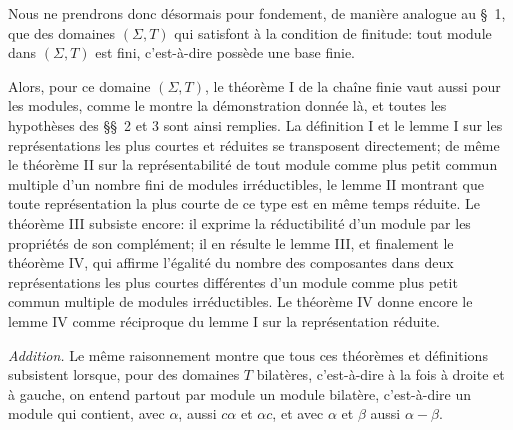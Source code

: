 Nous ne prendrons donc désormais pour fondement, de manière analogue au \S~1, que des domaines $(\Sigma,T)$ qui satisfont à la condition de finitude: tout module dans $(\Sigma,T)$ est fini, c'est-à-dire possède une base finie.

Alors, pour ce domaine $(\Sigma,T)$, le théorème I de la chaîne finie vaut aussi pour les modules, comme le montre la démonstration donnée là, et toutes les hypothèses des \S\S~2 et 3 sont ainsi remplies. La définition I et le lemme I sur les représentations les plus courtes et réduites se transposent directement; de même le théorème II sur la représentabilité de tout module comme plus petit commun multiple d'un nombre fini de modules irréductibles, le lemme II montrant que toute représentation la plus courte de ce type est en même temps réduite. Le théorème III subsiste encore: il exprime la réductibilité d'un module par les propriétés de son complément; il en résulte le lemme III, et finalement le théorème IV, qui affirme l'égalité du nombre des composantes dans deux représentations les plus courtes différentes d'un module comme plus petit commun multiple de modules irréductibles. Le théorème IV donne encore le lemme IV comme réciproque du lemme I sur la représentation réduite.

\emph{Addition.} Le même raisonnement montre que tous ces théorèmes et définitions subsistent lorsque, pour des domaines $T$ bilatères, c'est-à-dire à la fois à droite et à gauche, on entend partout par module un module bilatère, c'est-à-dire un module qui contient, avec $\alpha$, aussi $c\alpha$ et $\alpha c$, et avec $\alpha$ et $\beta$ aussi $\alpha-\beta$.

